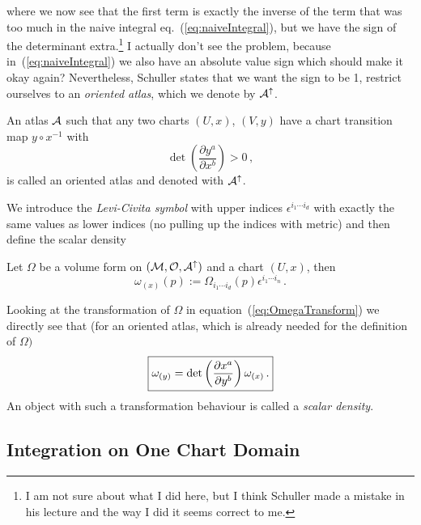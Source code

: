 \documentclass[11pt, a4paper, twocolumn]{article} %
\begin{document}
    where we now see that the first term is exactly the inverse of the term that was too much in
    the naive integral eq.~(\ref{eq:naiveIntegral}),
    but we have the sign of the determinant extra.\footnote{I am not sure about what I did here, but I think
    Schuller made a mistake in his lecture and the way I did it seems correct to me.}
    I actually don't see the problem, because in~(\ref{eq:naiveIntegral}) we also have an
    absolute value sign which should make it okay again?
    Nevertheless, Schuller states that we want the sign to be 1,
    restrict ourselves to an \textit{oriented atlas}, which we denote by
    $\mathcal{A}^\uparrow$.

    \begin{defn}
        An atlas $\mathcal{A}$ such that any two charts $(U,x)$, $(V,y)$ have
        a chart transition map $y\circ x^{-1}$ with
        \begin{equation}
            \det\left( \frac{\partial y^a}{\partial x^b} \right) > 0\,,
        \end{equation}
        is called an oriented atlas and denoted with $\mathcal{A}^\uparrow$.
    \end{defn}

    We introduce the \textit{Levi-Civita symbol} with upper indices $\epsilon^{i_1\cdots i_d}$ with
    exactly the same values as lower indices (no pulling up the indices with metric)
    and then define the scalar density
    \begin{defn}[$\omega_{(y)}$]
        Let $\Omega$ be a volume form on $(\mathcal{M},\mathcal{O}, \mathcal{A}^\uparrow)$
        and a chart $(U,x)$, then
        \begin{equation}
            \omega_{(x)}(p) := \Omega_{i_1\cdots i_d}(p)\epsilon^{i_1\cdots i_n}\,.
        \end{equation}
    \end{defn}
    Looking at the transformation of $\Omega$ in equation~(\ref{eq:OmegaTransform})
    we directly see that (for an oriented atlas, which is already needed for the definition
    of $\Omega)$
    \begin{equation}
        \boxed{%
            \omega_{(y)} = \det\left( \frac{\partial x^a}{\partial y^b} \right) \omega_{(x)}\,.
        }
    \end{equation}
    An object with such a transformation behaviour is called a \textit{scalar density}.
    
    \subsection{Integration on One Chart Domain}
    
\end{document}
